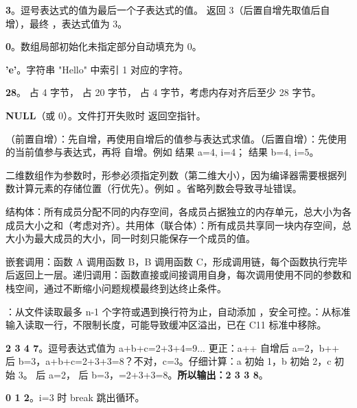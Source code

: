 \documentclass[a4paper,11pt]{article}
\begin{document}
\examtitle



\q \textbf{3}。逗号表达式的值为最后一个子表达式的值。 返回 3（后置自增先取值后自增），最终 ，表达式值为 3。

\q \textbf{0}。数组局部初始化未指定部分自动填充为 0。

\q \textbf{'e'}。字符串 "Hello" 中索引 1 对应的字符。

\q \textbf{28}。 占 4 字节， 占 20 字节， 占 4 字节，考虑内存对齐后至少 28 字节。

\q \textbf{NULL}（或 0）。文件打开失败时  返回空指针。


\q {}（前置自增）：先自增，再使用自增后的值参与表达式求值。（后置自增）：先使用  的当前值参与表达式，再将  自增。例如  结果 a=4, i=4； 结果 b=4, i=5。

\q 二维数组作为参数时，形参必须指定列数（第二维大小），因为编译器需要根据列数计算元素的存储位置（行优先）。例如 。省略列数会导致寻址错误。

\q 结构体：所有成员分配不同的内存空间，各成员占据独立的内存单元，总大小为各成员大小之和（考虑对齐）。共用体（联合体）：所有成员共享同一块内存空间，总大小为最大成员的大小，同一时刻只能保存一个成员的值。

\q 嵌套调用：函数 A 调用函数 B，B 调用函数 C，形成调用链，每个函数执行完毕后返回上一层。递归调用：函数直接或间接调用自身，每次调用使用不同的参数和栈空间，通过不断缩小问题规模最终到达终止条件。

\q {}：从文件读取最多 n-1 个字符或遇到换行符为止，自动添加 ，安全可控。：从标准输入读取一行，不限制长度，可能导致缓冲区溢出，已在 C11 标准中移除。


\q \textbf{2 3 4 7}。逗号表达式值为 a+b+c=2+3+4=9... 更正：a++ 自增后 a=2，b++ 后 b=3，a+b+c=2+3+3=8？不对，c=3。仔细计算：a 初始 1，b 初始 2，c 初始 3。 后 a=2， 后 b=3，=2+3+3=8。\textbf{所以输出：2 3 3 8}。

\q \textbf{0 1 2}。i=3 时 break 跳出循环。
\end{document}

